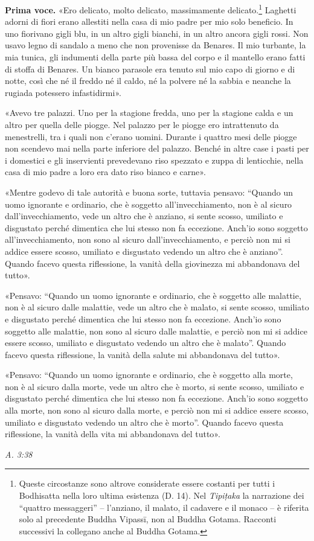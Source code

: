 \textbf{Prima voce.} «Ero delicato, molto delicato, massimamente
delicato.\footnote{Queste circostanze sono altrove considerate essere costanti per tutti i Bodhisatta nella loro ultima esistenza (D. 14). Nel \emph{Tipiṭaka} la narrazione dei “quattro messaggeri” – l’anziano, il malato, il cadavere e il monaco – è riferita solo al precedente Buddha Vipassī, non al Buddha Gotama. Racconti successivi la collegano anche al Buddha Gotama.} Laghetti adorni di fiori erano allestiti
nella casa di mio padre per mio solo beneficio. In uno fiorivano gigli
blu, in un altro gigli bianchi, in un altro ancora gigli rossi. Non
usavo legno di sandalo a meno che non provenisse da Benares. Il mio
turbante, la mia tunica, gli indumenti della parte più bassa del corpo e
il mantello erano fatti di stoffa di Benares. Un bianco parasole era
tenuto sul mio capo di giorno e di notte, così che né il freddo né il
caldo, né la polvere né la sabbia e neanche la rugiada potessero
infastidirmi».


«Avevo tre palazzi. Uno per la stagione fredda, uno per la stagione
calda e un altro per quella delle piogge. Nel palazzo per le piogge ero
intrattenuto da menestrelli, tra i quali non c’erano uomini. Durante i
quattro mesi delle piogge non scendevo mai nella parte inferiore del
palazzo. Benché in altre case i pasti per i domestici e gli inservienti
prevedevano riso spezzato e zuppa di lenticchie, nella casa di mio padre
a loro era dato riso bianco e carne».


«Mentre godevo di tale autorità e buona sorte, tuttavia pensavo: “Quando
un uomo ignorante e ordinario, che è soggetto all’invecchiamento, non è
al sicuro dall’invecchiamento, vede un altro che è anziano, si sente
scosso, umiliato e disgustato perché dimentica che lui stesso non fa
eccezione. Anch’io sono soggetto all’invecchiamento, non sono al sicuro
dall’invecchiamento, e perciò non mi si addice essere scosso, umiliato e
disgustato vedendo un altro che è anziano”. Quando facevo questa
riflessione, la vanità della giovinezza mi abbandonava del tutto».


«Pensavo: “Quando un uomo ignorante e ordinario, che è soggetto alle
malattie, non è al sicuro dalle malattie, vede un altro che è malato, si
sente scosso, umiliato e disgustato perché dimentica che lui stesso non
fa eccezione. Anch’io sono soggetto alle malattie, non sono al sicuro
dalle malattie, e perciò non mi si addice essere scosso, umiliato e
disgustato vedendo un altro che è malato”. Quando facevo questa
riflessione, la vanità della salute mi abbandonava del tutto».


«Pensavo: “Quando un uomo ignorante e ordinario, che è soggetto alla
morte, non è al sicuro dalla morte, vede un altro che è morto, si sente
scosso, umiliato e disgustato perché dimentica che lui stesso non fa
eccezione. Anch’io sono soggetto alla morte, non sono al sicuro dalla
morte, e perciò non mi si addice essere scosso, umiliato e disgustato
vedendo un altro che è morto”. Quando facevo questa riflessione, la
vanità della vita mi abbandonava del tutto».


\emph{A. 3:38}


